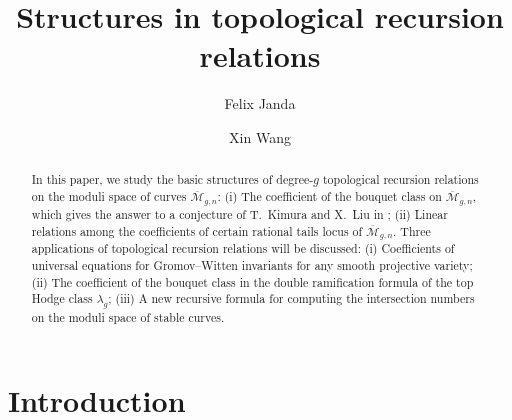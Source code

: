 \documentclass[12pt,reqno]{amsart}
\theoremstyle{plain}
\theoremstyle{definition}
\theoremstyle{remark}
\begin{document}
\title{Structures in topological recursion relations}

\author[F.~Janda]{Felix Janda}
\address{Department of Mathematics, University of Illinois Urbana--Champaign, Urbana, IL 61801, USA}

\author[X.~Wang]{Xin Wang}
\address{School of Mathematics, Shandong University, Jinan, Shandong 250100, China}

\begin{abstract}

  In this paper, we study the basic structures of degree-$g$ topological recursion relations on the moduli space of curves $\overline{\mathcal{M}}_{g,n}$: (i) The coefficient of the bouquet class on $\overline{\mathcal{M}}_{g,n}$, which gives the answer  to a conjecture of T.~Kimura and X.~Liu in \cite{kimura2006genus}; (ii) Linear relations among the coefficients of certain rational tails locus of $\overline{\mathcal{M}}_{g,n}$.
  Three applications of topological recursion relations will be discussed: (i) Coefficients of universal equations for Gromov--Witten invariants for any smooth projective variety; (ii) The coefficient of the bouquet class in the double ramification formula of the top Hodge class $\lambda_g$; (iii) A new recursive formula for computing the intersection numbers on the moduli space of stable curves.
\end{abstract}


\maketitle
\tableofcontents
\allowdisplaybreaks
\section{Introduction}
\end{document}
